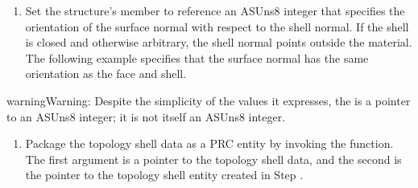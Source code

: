 \documentclass[letterpaper,12pt,english,openany,oneside]{sphinxmanual}
\begin{document}
\begin{sphinxVerbatim}[commandchars=\\\{\}]
 

  
  
\end{sphinxVerbatim}
\begin{enumerate}
%
\setcounter{enumi}{4}
\item {} 
Set the  structure’s  member to reference an ASUns8 integer that specifies the orientation of the surface normal with respect to the shell normal. If the shell is closed and otherwise arbitrary, the shell normal points outside the material. The following example specifies that the surface normal has the same orientation as the face and shell.

\end{enumerate}

\begin{sphinxadmonition}{warning}{Warning:}
Despite the simplicity of the values it expresses, the  is a pointer to an ASUns8 integer; it is not itself an ASUns8 integer.
\end{sphinxadmonition}

\begin{sphinxVerbatim}[commandchars=\\\{\}]
   
  
\end{sphinxVerbatim}
\begin{enumerate}
%
\setcounter{enumi}{5}
\item {} 
Package the topology shell data as a PRC entity by invoking the  function. The first argument is a pointer to the topology shell data, and the second is the pointer to the topology shell entity created in Step .

\end{enumerate}
\end{document}
